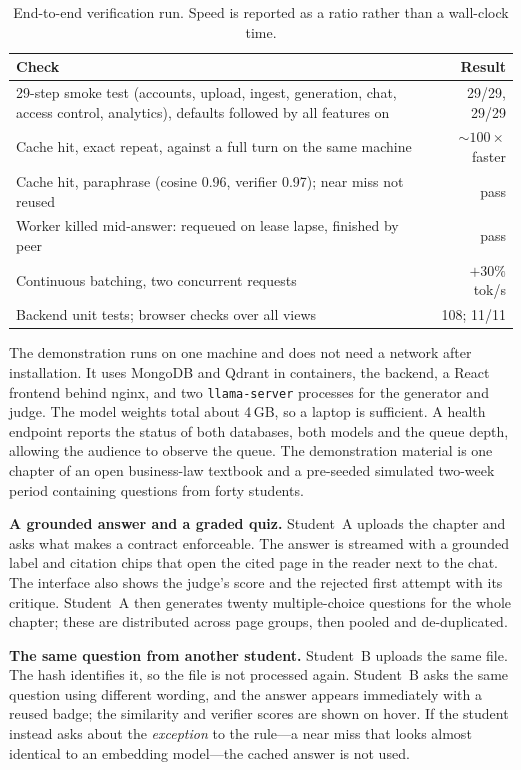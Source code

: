 \documentclass[conference]{IEEEtran}
\begin{document}
\begin{table}[t]
\caption{End-to-end verification run. Speed is reported as a ratio rather than a wall-clock time.}
\label{tab:verify}
\centering
\footnotesize
\begin{tabular}{@{}p{}r@{}}
\toprule
\textbf{Check} & \textbf{Result} \\
\midrule
29-step smoke test (accounts, upload, ingest, generation, chat, access control, analytics), defaults
followed by all features on & 29/29, 29/29 \\
Cache hit, exact repeat, against a full turn on the same machine & $\sim$$100\times$ faster \\
Cache hit, paraphrase (cosine 0.96, verifier 0.97); near miss not reused & pass \\
Worker killed mid-answer: requeued on lease lapse, finished by peer & pass \\
Continuous batching, two concurrent requests & $+30\%$ tok/s \\
Backend unit tests; browser checks over all views & 108; 11/11 \\
\bottomrule
\end{tabular}
\end{table}

The demonstration runs on one machine and does not need a network after installation. It uses
MongoDB and Qdrant in containers, the backend, a React frontend behind nginx, and two
\texttt{llama-server} processes for the generator and judge. The model weights total about 4\,GB, so
a laptop is sufficient. A health endpoint reports the status of both databases, both models and the
queue depth, allowing the audience to observe the queue. The demonstration material is one chapter
of an open business-law textbook \cite{valbrune2019bizlaw} and a pre-seeded simulated two-week period
containing questions from forty students.

\textbf{A grounded answer and a graded quiz.} Student~A uploads the chapter and asks what makes a
contract enforceable. The answer is streamed with a grounded label and citation chips that open the
cited page in the reader next to the chat. The interface also shows the judge's score and the rejected
first attempt with its critique. Student~A then generates twenty multiple-choice questions for the
whole chapter; these are distributed across page groups, then pooled and de-duplicated.

\textbf{The same question from another student.} Student~B uploads the same file. The hash identifies it, so the file is not processed again.
Student~B asks the same question using different wording, and the answer appears immediately with a
reused badge; the similarity and verifier scores are shown on hover. If the student instead asks
about the \emph{exception} to the rule---a near miss that looks almost identical to an embedding
model---the cached answer is not used.
\end{document}
